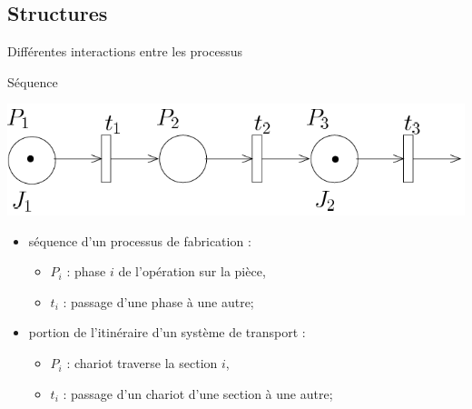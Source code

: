 \documentclass[compress]{beamer}
\begin{document}
\subsection{Structures}
\begin{frame}{Différentes interactions entre les processus}
\begin{block}{Séquence}
	\begin{center}
		\includegraphics[width=.6\linewidth]{fseq-inf}
	\end{center}
	\begin{itemize}
	\item séquence d'un processus de fabrication :
	   \begin{itemize}
	   \item $P_i$ : phase $i$ de l'opération sur la pièce, 
	   \item $t_i$ : passage d'une phase à une autre;
	   \end{itemize}
	\item portion de l'itinéraire d'un système de transport :     
	   \begin{itemize}
	   \item $P_i$ : chariot traverse la section $i$,
	   \item $t_i$ : passage d'un chariot d'une section  à une autre;
	   \end{itemize}
	\end{itemize}
\end{block}
\end{frame}
 
\end{document}
